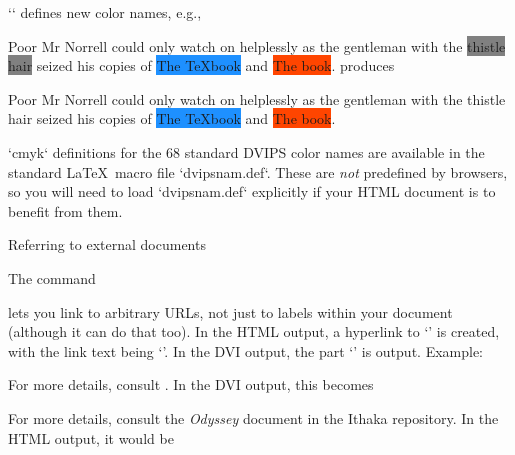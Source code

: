 `\definecolor` defines new color names, e.g.,

\begintt
{}

Poor Mr Norrell could only watch on helplessly as the gentleman
with the \colorbox{gray}{\color{thistle}thistle hair} seized his
copies of \colorbox{dodgerblue}{\color{white} The \TeX book} and
\colorbox{orangered}{\color{white} The \MF book}.
\endtt
produces

\quote
Poor Mr Norrell could only watch on helplessly as the gentleman
with the {\color{thistle}thistle hair} seized his
copies of \colorbox{dodgerblue}{\color{white} The \TeX book} and
\colorbox{orangered}{\color{white} The \MF book}.
\endquote

`cmyk` definitions for the 68 standard DVIPS
color names are available in the standard \LaTeX\ macro
file `dvipsnam.def`.  These are {\em not} predefined
by browsers, so you will need to load `dvipsnam.def`
explicitly if your HTML document is to benefit from
them.

 Referring to external documents

%
The command

\begintt
{}
\endtt
%
lets
you link to arbitrary URLs, not just to labels within
your document (although it can do that too).  In the
HTML output, a hyperlink to ‘’ is created, with
the link text being ‘’.  In the DVI
output, the part ‘’ is output.  Example:

\begintt
For more details, consult
.
\endtt
%
In the DVI output, this becomes

\quote
For more details, consult the {\it Odyssey\/} document in the
Ithaka repository.
\endquote
In the HTML output, it would be

